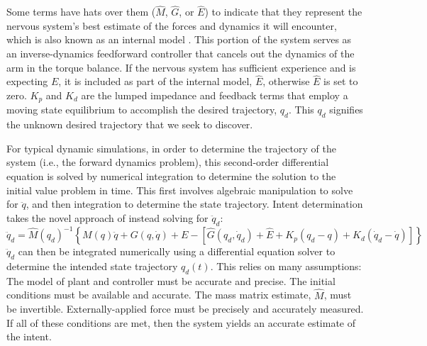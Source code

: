 Some terms have hats over them ($\hat{M}$, $\hat{G}$, or $\hat{E}$) to indicate that they represent the nervous system's best estimate of the forces and dynamics it will encounter, which is also known as an internal model \cite{shadmehr1994adaptive}. This portion of the system serves as an inverse-dynamics feedforward controller that cancels out the dynamics of the arm in the torque balance. If the nervous system has sufficient experience and is expecting $E$, it is included as part of the internal model, $\hat{E}$, otherwise $\hat{E}$ is set to zero. $K_p$ and $K_d$ are the lumped impedance and feedback terms that employ a moving state equilibrium to accomplish the desired trajectory, $q_d$. This $q_d$ signifies the unknown desired trajectory that we seek to discover.

For typical dynamic simulations, in order to determine the trajectory of the system (i.e., the forward dynamics problem), this second-order differential equation is solved by numerical integration to determine the solution to the initial value problem in time. This first involves algebraic manipulation to solve for $\ddot{q}$, and then integration to determine the state trajectory. Intent determination takes the novel approach of instead solving for $\ddot{q}_d$:
\begin{equation}
\ddot{q}_d=\hat{M}(q_d)^{-1}\left\{M(q)\ddot{q}+G(q,\dot{q})+E-[\hat{G}(q_d,\dot{q}_d)+\hat{E}+K_p(q_d-q)+K_d(\dot{q}_d-\dot{q})]\right\}
\end{equation}  
$\ddot{q}_d$ can then be integrated numerically using a differential equation solver to determine the intended state trajectory $q_d(t)$. This relies on many assumptions: The model of plant and controller must be accurate and precise. The initial conditions must be available and accurate. The mass matrix estimate, $\hat{M}$, must be invertible. Externally-applied force must be precisely and accurately measured. If all of these conditions are met, then the system yields an accurate estimate of the intent.

